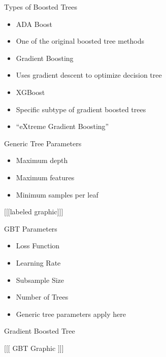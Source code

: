 \documentclass[ignorenonframetext,]{beamer}
\begin{document}
\begin{frame}{Types of Boosted Trees}

\begin{itemize}
\item
  ADA Boost
\item
  One of the original boosted tree methods
\item
  Gradient Boosting
\item
  Uses gradient descent to optimize decision tree
\item
  XGBoost
\item
  Specific subtype of gradient boosted trees
\item
  ``eXtreme Gradient Boosting''
\end{itemize}

\end{frame}

\begin{frame}{Generic Tree Parameters}

\begin{itemize}
\item
  Maximum depth
\item
  Maximum features
\item
  Minimum samples per leaf
\end{itemize}

{[}{[}{[}labeled graphic{]}{]}{]}

\end{frame}

\begin{frame}{GBT Parameters}

\begin{itemize}
\item
  Loss Function
\item
  Learning Rate
\item
  Subsample Size
\item
  Number of Trees
\item
  Generic tree parameters apply here
\end{itemize}

\end{frame}

\begin{frame}{Gradient Boosted Tree}

{[}{[}{[} GBT Graphic {]}{]}{]}

\end{frame}
\end{document}
